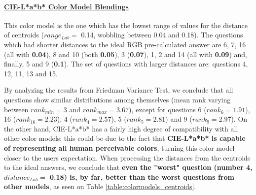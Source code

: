 \paragraph{\ul{CIE-L*a*b* Color Model Blendings}} \par
\label{par:lchcolormodel}
%
This color model is the one which has the lowest range of values for the distance of centroids ($range_{Lab} = $ 0.14, wobbling between 0.04 and 0.18). The questions which had shorter distances to the ideal RGB pre-calculated answer are 6, 7, 16 (all with \textbf{0.04}), 8 and 10 (both \textbf{0.05}),
3 (\textbf{0.07}), 1, 2 and 14 (all with \textbf{0.09}) and, finally, 5 and 9 (\textbf{0.1}). The set of questions with larger distances are: questions 4, 12, 11, 13 and 15. \par
%
By analyzing the results from Friedman Variance Test, we conclude that all questions show similar distributions among themselves (mean rank varying between $rank_{min} = 3$ and $rank_{max} = 3.67$), except for questions 6 ($rank_{6} = 1.91$), 16 ($rank_{16} = 2.23$), 4 ($rank_{4} = 2.57$),
5 ($rank_{5} = 2.81$) and 9 ($rank_{9} = 2.97$). On the other hand, CIE-L*a*b* has a fairly high degree of compatibility with all other color models: this could be due to the fact that \textbf{CIE-L*a*b* is capable of representing all human perceivable colors}, turning this color model closer to the users
expectation. When processing the distances from the centroids to the ideal answers, we conclude that \textbf{even the "worst" question (number 4, $distance_{Lab} = $ 0.18) is, by far, better than the worst questions from other models}, as seen on Table \ref{table:colormodels_centroids}. \par
%
